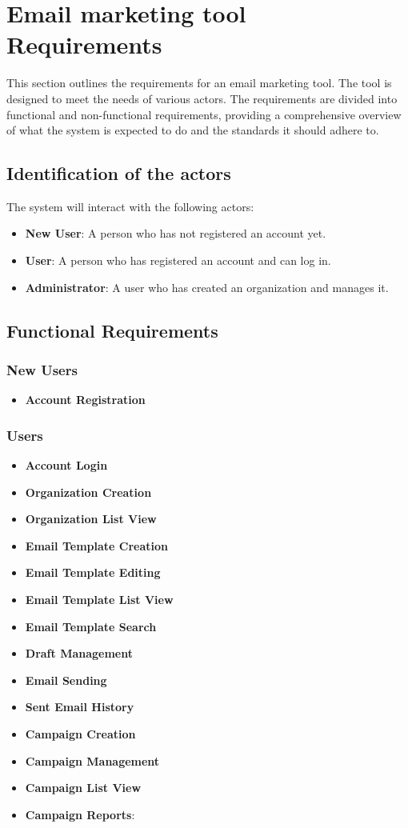\section{Email marketing tool Requirements}

This section outlines the requirements for an email marketing tool. The tool is designed to meet the needs of various actors. The requirements are divided into functional and non-functional requirements, providing a comprehensive overview of what the system is expected to do and the standards it should adhere to.

\subsection{Identification of the actors}
The system will interact with the following actors:
\begin{itemize}
\item \textbf{New User}: A person who has not registered an account yet.
\item \textbf{User}: A person who has registered an account and can log in.
\item \textbf{Administrator}: A user who has created an organization and manages it.
\end{itemize}

\subsection{Functional Requirements}

\subsubsection{New Users}
\begin{itemize}
    \item \textbf{Account Registration}
\end{itemize}

\subsubsection{Users}
\begin{itemize}
\item \textbf{Account Login}
\item \textbf{Organization Creation}
\item \textbf{Organization List View}
\item \textbf{Email Template Creation}
\item \textbf{Email Template Editing}
\item \textbf{Email Template List View}
\item \textbf{Email Template Search}
\item \textbf{Draft Management}
\item \textbf{Email Sending}
\item \textbf{Sent Email History}
\item \textbf{Campaign Creation}
\item \textbf{Campaign Management}
\item \textbf{Campaign List View}
\item \textbf{Campaign Reports}:
\end{itemize}

